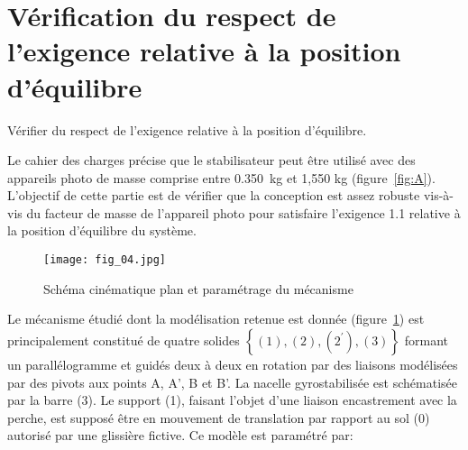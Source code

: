 \section{\label{part:2} Vérification du respect de l'exigence relative à la position d'équilibre}
\ifprof
\else
\begin{obj}
Vérifier du respect de l'exigence relative à la position d'équilibre.
\end{obj}
Le cahier des charges précise que le stabilisateur peut être utilisé avec des appareils photo de masse comprise entre \SI{0,350}{kg} et 1,550 kg (figure~\ref{fig:A}). L'objectif de cette partie est de vérifier que la conception est assez robuste vis-à-vis du facteur de masse de l'appareil photo pour satisfaire l'exigence 1.1 relative à la position d'équilibre du système.


\begin{figure}[H]
\centering
\texttt{[image: fig\_04.jpg]}
\caption{\label{fig:04} Schéma cinématique plan et paramétrage du mécanisme}
\end{figure}



Le mécanisme étudié dont la modélisation retenue est donnée (figure~\ref{fig:04}) est principalement constitué de quatre solides $\left\{(1),(2),\left(2^{\prime}\right),(3)\right\}$ formant un parallélogramme et guidés deux à deux en rotation par des liaisons modélisées par des pivots aux points A, A', B et B'. La nacelle gyrostabilisée est schématisée par la barre (3). Le support (1), faisant l'objet d'une liaison encastrement avec la perche, est supposé être en mouvement de translation par rapport au sol (0) autorisé par une glissière fictive. Ce modèle est paramétré par:

